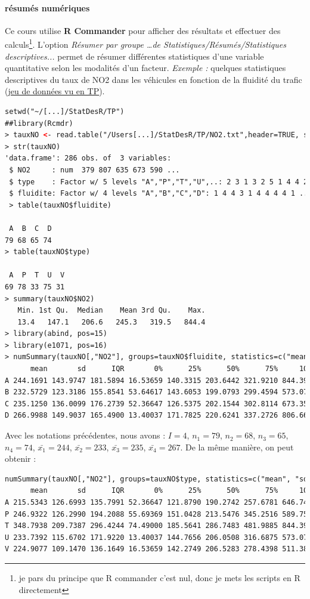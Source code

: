 \paragraph{résumés numériques}
Ce cours utilise \textbf{R Commander} pour afficher des résultats et effectuer des calculs\footnote{je pars du principe que R commander c'est nul, donc je mets les scripts en R directement}.\newline
L'option \textit{Résumer par groupe \dots de Statistiques/Résumés/Statistiques descriptives...} permet de résumer différentes statistiques d'une variable quantitative selon les modalités d'un facteur.\newline
\textit{Exemple : } quelques statistiques descriptives du taux de NO2 dans les véhicules
en fonction de la fluidité du trafic (\underline{\href{http://www.math.sciences.univ-nantes.fr/~lavancie/enseignement.html}{jeu de données vu en TP}}).
\begin{lstlisting}[language=html]
setwd("~/[...]/StatDesR/TP")
##library(Rcmdr)
> tauxNO <- read.table("/Users[...]/StatDesR/TP/NO2.txt",header=TRUE, sep="", na.strings="NA", dec=".", strip.white=TRUE)
> str(tauxNO)
'data.frame': 286 obs. of  3 variables:
 $ NO2     : num  379 807 635 673 590 ...
 $ type    : Factor w/ 5 levels "A","P","T","U",..: 2 3 1 3 2 5 1 4 4 2 ...
 $ fluidite: Factor w/ 4 levels "A","B","C","D": 1 4 4 3 1 4 4 4 4 1 ...
 > table(tauxNO$fluidite)

 A  B  C  D 
79 68 65 74 
> table(tauxNO$type)

 A  P  T  U  V 
69 78 33 75 31 
> summary(tauxNO$NO2)
   Min. 1st Qu.  Median    Mean 3rd Qu.    Max. 
   13.4   147.1   206.6   245.3   319.5   844.4
> library(abind, pos=15)
> library(e1071, pos=16)
> numSummary(tauxNO[,"NO2"], groups=tauxNO$fluidite, statistics=c("mean", "sd", "IQR", "quantiles"), quantiles=c(0,.25,.5,.75,1))
      mean       sd      IQR       0%      25%      50%      75%     100% data:n
A 244.1691 143.9747 181.5894 16.53659 140.3315 203.6442 321.9210 844.3919     79
B 232.5729 123.3186 155.8541 53.64617 143.6053 199.0793 299.4594 573.0764     68
C 235.1250 136.0099 176.2739 52.36647 126.5375 202.1544 302.8114 673.3514     65
D 266.9988 149.9037 165.4900 13.40037 171.7825 220.6241 337.2726 806.6694     74
\end{lstlisting}
Avec les notations précédentes, nous avons : $I = 4$, $n_{1} = 79$, $n_{2} = 68$, $n_{3} = 65$, $n_{4} = 74$, $\bar{x_{1}} = 244$, $\bar{x_{2}} = 233$, $\bar{x_{3}} = 235$, $\bar{x_{4}} = 267$. De la même manière, on peut obtenir : 
\begin{lstlisting}[language=html]
numSummary(tauxNO[,"NO2"], groups=tauxNO$type, statistics=c("mean", "sd", "IQR", "quantiles"), quantiles=c(0,.25,.5,.75,1))
      mean       sd      IQR       0%      25%      50%      75%     100% data:n
A 215.5343 126.6993 135.7991 52.36647 121.8790 190.2742 257.6781 646.7451     69
P 246.9322 126.2990 194.2088 55.69369 151.0428 213.5476 345.2516 589.7507     78
T 348.7938 209.7387 296.4244 74.49000 185.5641 286.7483 481.9885 844.3919     33
U 233.7392 115.6702 171.9220 13.40037 144.7656 206.0508 316.6875 573.0764     75
V 224.9077 109.1470 136.1649 16.53659 142.2749 206.5283 278.4398 511.3834     31
\end{lstlisting}
